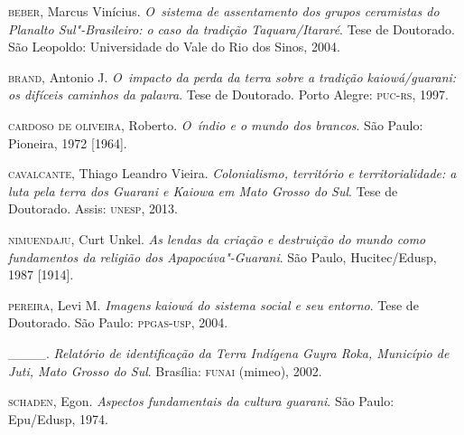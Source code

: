 \begin{Parskip}
\textsc{beber}, Marcus Vinícius. \emph{O~sistema de assentamento dos grupos ceramistas
do Planalto Sul"-Brasileiro: o caso da tradição Taquara/Itararé}. Tese de
Doutorado. São Leopoldo: Universidade do Vale do Rio dos Sinos, 2004.

\textsc{brand}, Antonio J. \emph{O~impacto da perda da terra sobre a tradição
kaiowá/guarani: os difíceis caminhos da palavra}. Tese de Doutorado.
Porto Alegre: \textsc{puc}-\textsc{rs}, 1997.

\textsc{cardoso de oliveira}, Roberto. \emph{O~índio e o mundo dos brancos}. São Paulo:
Pioneira, 1972 [1964].

\textsc{cavalcante}, Thiago Leandro Vieira. \emph{Colonialismo, território e
territorialidade: a luta pela terra dos Guarani e Kaiowa em Mato Grosso
do Sul}. Tese de Doutorado. Assis: \textsc{unesp}, 2013.

\textsc{nimuendaju}, Curt Unkel. \emph{As lendas da criação e destruição do mundo como
fundamentos da religião dos Apapocúva"-Guarani}. São Paulo,
Hucitec/Edusp, 1987 [1914].

\textsc{pereira}, Levi M. \emph{Imagens kaiowá do sistema social e seu entorno}. Tese de
Doutorado. São Paulo: \textsc{ppgas}-\textsc{usp}, 2004.

\_\_\_\_. \emph{Relatório de identificação da Terra Indígena Guyra Roka,
Município de Juti, Mato Grosso do Sul}. Brasília: \textsc{funai} (mimeo), 2002.

\textsc{schaden}, Egon. \emph{Aspectos fundamentais da cultura guarani}. São Paulo:
Epu/Edusp, 1974.
\end{Parskip}

\clearpage

\vspace*{\fill}

